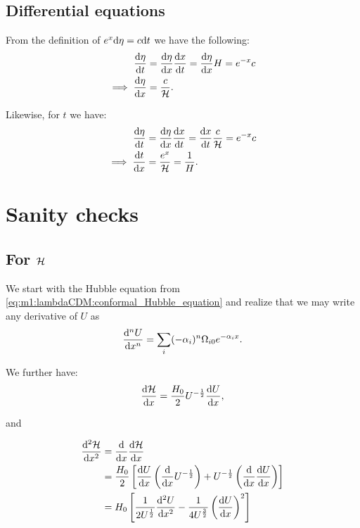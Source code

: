     \subsection{Differential equations}
    From the definition of $e^x\mathrm{d}\eta = c\mathrm{d} t$ we have the following:
    \begin{equation}
        \begin{split}
            \dv{\eta}{t} &= \dv{\eta}{x}\dv{x}{t}= \dv{\eta}{x}H = e^{-x}c \\
            \implies \dv{\eta}{x} &= \frac{c}{\mathcal{H}}.
        \end{split}
    \end{equation}

    Likewise, for $t$ we have:
    \begin{equation}
        \begin{split}
            \dv{\eta}{t} &= \dv{\eta}{x}\dv{x}{t} = \dv{x}{t}\frac{c}{\mathcal{H}} = e^{-x}c\\
            \implies \dv{t}{x} &= \frac{e^x}{\mathcal{H}} = \frac{1}{H}.
        \end{split}
    \end{equation}


\section{Sanity checks}\label{app:sanity}
\subsection{For $\mathcal{H}$}
    We start with the Hubble equation from \cref{eq:m1:lambdaCDM:conformal_Hubble_equation} and realize that we may write any derivative of $U$ as
    \begin{equation}
        \dv[n]{U}{x} = \sum_i(-\alpha_i)^n\Omega_{i0}e^{-\alpha_ix}.
    \end{equation}

    We further have:
    \begin{equation}
        \dv{\mathcal{H}}{x} = \frac{H_0}{2}U^{-\frac{1}{2}}\dv{U}{x},
    \end{equation}

    and
    
    \begin{equation}
        \begin{split}
            \dv[2]{\mathcal{H}}{x} &= \dv{}{x}\dv{\mathcal{H}}{x}\\
            &= \frac{H_0}{2}\left[\dv{U}{x}\left(\dv{}{x}U^{-\frac{1}{2}}\right) + U^{-\frac{1}{2}}\left(\dv{}{x}\dv{U}{x}\right)\right]\\
            &=H_0\left[\frac{1}{2U^{\frac{1}{2}}}\dv[2]{U}{x} - \frac{1}{4U^{\frac{3}{2}}}\left(\dv{U}{x}\right)^2\right]
        \end{split}
    \end{equation}


